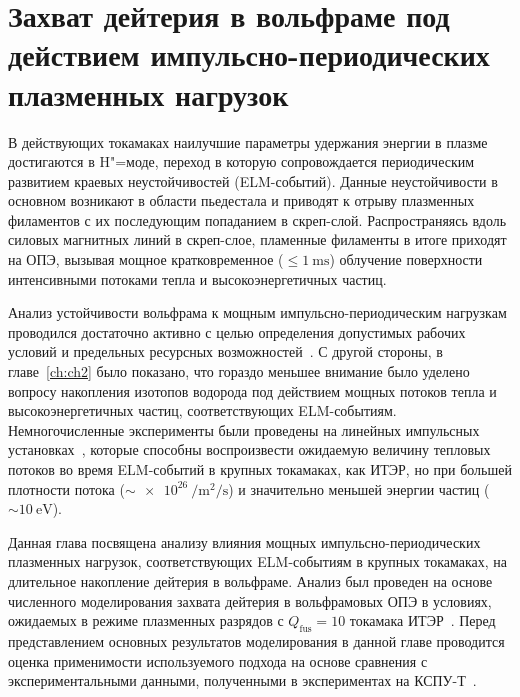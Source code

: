 \chapter{Захват дейтерия в вольфраме под действием импульсно-периодических плазменных нагрузок}\label{ch:ch3}

В действующих токамаках наилучшие параметры удержания энергии в плазме достигаются в H"=моде, переход в которую сопровождается периодическим развитием краевых неустойчивостей (ELM-событий). Данные неустойчивости в основном возникают в области пьедестала и приводят к отрыву плазменных филаментов с их последующим попаданием в скреп-слой. Распространяясь вдоль силовых магнитных линий в скреп-слое, пламенные филаменты в итоге приходят на ОПЭ, вызывая мощное кратковременное (\( \leq \SI{1}{\milli\second} \)) облучение поверхности интенсивными потоками тепла и высокоэнергетичных частиц.

Анализ устойчивости вольфрама к мощным импульсно-периодическим нагрузкам проводился достаточно активно с целью определения допустимых рабочих условий и предельных ресурсных возможностей~\cite{Pintsuk2012,Budaev2015,Rieth2019}. С другой стороны, в главе~\cref{ch:ch2} было показано, что гораздо меньшее внимание было уделено вопросу накопления изотопов водорода под действием мощных потоков тепла и высокоэнергетичных частиц, соответствующих ELM-событиям. Немногочисленные эксперименты были проведены на линейных импульсных установках~\cite{Poskakalov2020,Ogorodnikova,Nishijima2011}, которые способны воспроизвести ожидаемую величину тепловых потоков во время ELM-событий в крупных токамаках, как ИТЭР, но при большей плотности потока (\(\sim\SI{e26}{\per\meter\squared\per\second}\)) и значительно меньшей энергии частиц (\(\sim\SI{10}{\electronvolt}\)). 

Данная глава посвящена анализу влияния мощных импульсно-периодических плазменных нагрузок, соответствующих ELM-событиям в крупных токамаках, на длительное накопление дейтерия в вольфраме. Анализ был проведен на основе численного моделирования захвата дейтерия в вольфрамовых ОПЭ в условиях, ожидаемых в режиме плазменных разрядов с \(Q_\mathrm{fus}=\num{10}\) токамака ИТЭР~\cite{Kulagin2025_JNM}. Перед представлением основных результатов моделирования в данной главе проводится оценка применимости используемого подхода на основе сравнения с экспериментальными данными, полученными в экспериментах на КСПУ-Т~\cite{Poskakalov2020}. 

